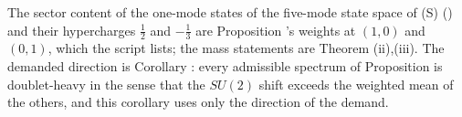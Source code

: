 The sector content of the one-mode states of the five-mode state space of (S) () and their hypercharges $\tfrac12$ and $-\tfrac13$ are Proposition 's weights at $(1,0)$ and $(0,1)$, which the script lists; the mass statements are Theorem (ii),(iii). The demanded direction is Corollary : every admissible spectrum of Proposition  is doublet-heavy in the sense that the $SU(2)$ shift exceeds the weighted mean of the others, and this corollary uses only the direction of the demand.
